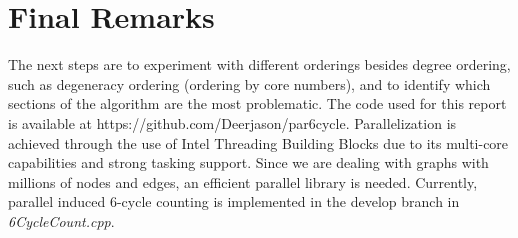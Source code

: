 \documentclass[11pt]{article}
\begin{document}
\section {Final Remarks}

The next steps are to experiment with different orderings besides degree ordering, such as degeneracy ordering (ordering by core numbers), and to identify which sections of the algorithm are the most problematic.
The code used for this report is available at https://github.com/Deerjason/par6cycle.
Parallelization is achieved through the use of Intel Threading Building Blocks due to its multi-core capabilities and strong tasking support.
Since we are dealing with graphs with millions of nodes and edges, an efficient parallel library is needed.
Currently, parallel induced 6-cycle counting is implemented in the develop branch in \textit{6CycleCount.cpp}.

{}

\end{document}
